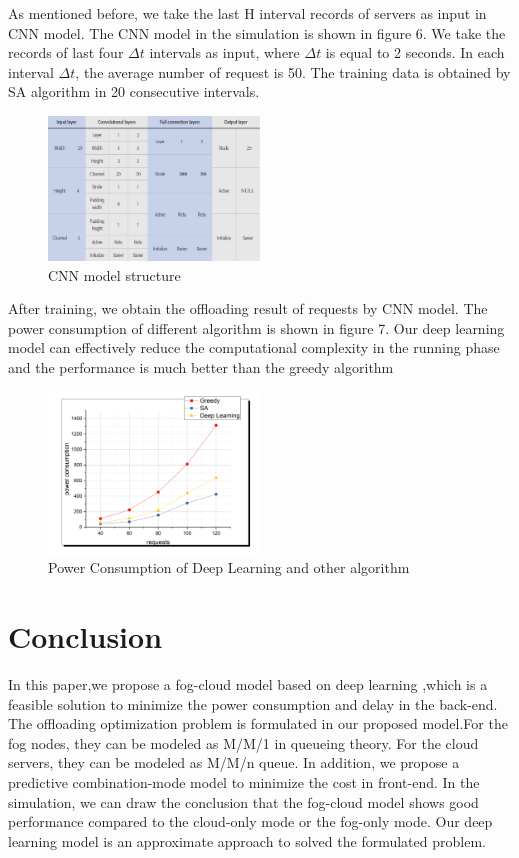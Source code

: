 \documentclass[twoside,twocolumn]{article}
\begin{document}
As mentioned before, we take the last H interval records of servers as input in CNN model. The CNN model in the simulation is shown in figure 6. We take the records of last four $\Delta t$ intervals as input, where $\Delta t$ is equal to 2 seconds. In each interval $\Delta t$, the average number of request is 50. The training data is obtained by SA algorithm in 20 consecutive intervals. 
\begin{figure}[htbp]
\includegraphics[width = 0.5\textwidth]{g.png}
\caption{CNN model structure}
\end{figure}

After training, we obtain the offloading result of requests by CNN model. The power consumption of different algorithm is shown in figure 7. Our deep learning model can effectively reduce the computational complexity in the running phase and the performance is much better than the greedy algorithm
\begin{figure}[htbp]
\includegraphics[width = 0.5\textwidth]{h.png}
\caption{Power Consumption of Deep Learning and other algorithm}
\end{figure}


\section{Conclusion}
In this paper,we propose a fog-cloud model based on deep learning ,which is a feasible solution to minimize the power consumption and delay in the back-end. The offloading optimization problem is formulated in our proposed model.For the fog nodes, they can be modeled as M/M/1 in queueing theory. For the cloud servers, they can be modeled as M/M/n queue. In addition, we propose a predictive combination-mode model to minimize the cost in front-end. In the simulation, we can draw the conclusion that the fog-cloud model shows good performance compared to the cloud-only mode or the fog-only mode. Our deep learning model is an approximate approach to solved the formulated problem.
%
%
\end{document}
